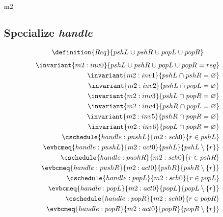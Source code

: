 \documentclass[12pt]{amsart}
\begin{document}
\begin{machine}{m2}
  \subsection{Specialize \emph{handle}}
  \begin{align*}
    \definition{Req}{ pshL \bunion 
        pshR \bunion 
        popL \bunion 
        popR } 
  \end{align*}
  \begin{align}
    \invariant{m2:inv0}{ pshL \bunion 
        pshR \bunion 
        popL \bunion 
        popR 
        = req } \\
    \invariant{m2:inv1}{ pshL \binter pshR = \emptyset } \\
    \invariant{m2:inv2}{ pshL \binter popL = \emptyset } \\
    \invariant{m2:inv3}{ pshL \binter popR = \emptyset } \\
    \invariant{m2:inv4}{ pshR \binter popL = \emptyset } \\
    \invariant{m2:inv5}{ pshR \binter popR = \emptyset } \\
    \invariant{m2:inv6}{ popL \binter popR = \emptyset } \\
    \cschedule{handle:pushL}{m2:sch0}{ r \in pshL } \\
    \evbcmeq{handle:pushL}{m2:act0}{pshL}{pshL \setminus \{ r \}} \\
    \cschedule{handle:pushR}{m2:sch0}{ r \in pshR } \\
    \evbcmeq{handle:pushR}{m2:act0}{pshR}{pshR \setminus \{ r \}} \\
    \cschedule{handle:popL}{m2:sch0}{ r \in popL } \\
    \evbcmeq{handle:popL}{m2:act0}{popL}{popL \setminus \{ r \}} \\
    \cschedule{handle:popR}{m2:sch0}{ r \in popR } \\
    \evbcmeq{handle:popR}{m2:act0}{popR}{popR \setminus \{ r \}} 

\end{align}
\end{machine}
\end{document}
